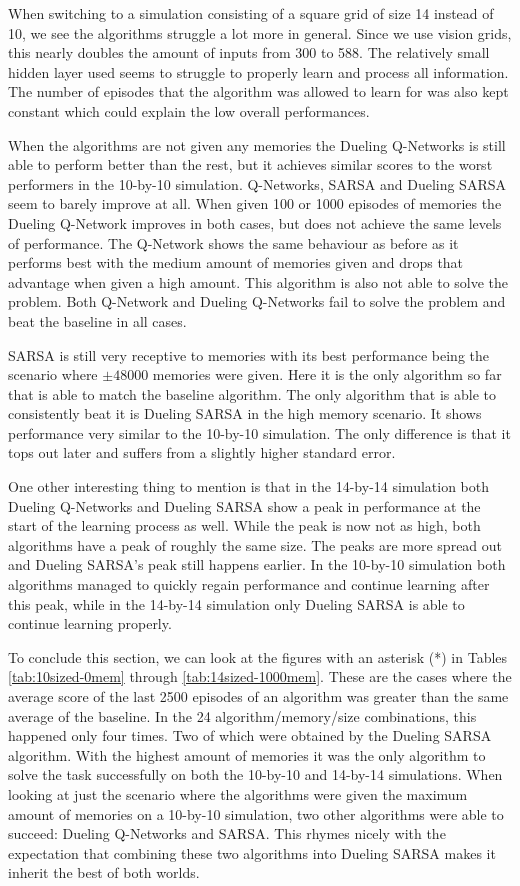 When switching to a simulation consisting of a square grid of size 14 instead of 10, we see the algorithms struggle a lot more in general. Since we use vision grids, this nearly doubles the amount of inputs from 300 to 588. The relatively small hidden layer used seems to struggle to properly learn and process all information. The number of episodes that the algorithm was allowed to learn for was also kept constant which could explain the low overall performances.

When the algorithms are not given any memories the Dueling Q-Networks is still able to perform better than the rest, but it achieves similar scores to the worst performers in the 10-by-10 simulation. Q-Networks, SARSA and Dueling SARSA seem to barely improve at all. When given 100 or 1000 episodes of memories the Dueling Q-Network improves in both cases, but does not achieve the same levels of performance. The Q-Network shows the same behaviour as before as it performs best with the medium amount of memories given and drops that advantage when given a high amount. This algorithm is also not able to solve the problem. Both Q-Network and Dueling Q-Networks fail to solve the problem and beat the baseline in all cases.

SARSA is still very receptive to memories with its best performance being the scenario where $\pm 48000$ memories were given. Here it is the only algorithm so far that is able to match the baseline algorithm. The only algorithm that is able to consistently beat it is Dueling SARSA in the high memory scenario. It shows performance very similar to the 10-by-10 simulation. The only difference is that it tops out later and suffers from a slightly higher standard error.

One other interesting thing to mention is that in the 14-by-14 simulation both Dueling Q-Networks and Dueling SARSA show a peak in performance at the start of the learning process as well. While the peak is now not as high, both algorithms have a peak of roughly the same size. The peaks are more spread out and Dueling SARSA's peak still happens earlier. In the 10-by-10 simulation both algorithms managed to quickly regain performance and continue learning after this peak, while in the 14-by-14 simulation only Dueling SARSA is able to continue learning properly.

To conclude this section, we can look at the figures with an asterisk (*) in Tables \ref{tab:10sized-0mem} through \ref{tab:14sized-1000mem}. These are the cases where the average score of the last 2500 episodes of an algorithm was greater than the same average of the baseline. In the 24 algorithm/memory/size combinations, this happened only four times. Two of which were obtained by the Dueling SARSA algorithm. With the highest amount of memories it was the only algorithm to solve the task successfully on both the 10-by-10 and 14-by-14 simulations. When looking at just the scenario where the algorithms were given the maximum amount of memories on a 10-by-10 simulation, two other algorithms were able to succeed: Dueling Q-Networks and SARSA. This rhymes nicely with the expectation that combining these two algorithms into Dueling SARSA makes it inherit the best of both worlds.
